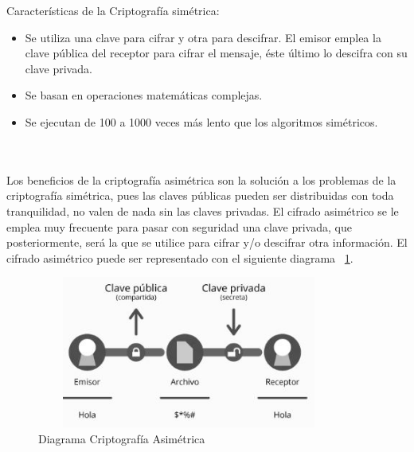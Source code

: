 \bigskip Características de la Criptografía simétrica: \begin{itemize}
	\item Se utiliza una clave para cifrar y otra para descifrar. El emisor emplea la clave pública del receptor para cifrar el mensaje, 	éste último lo descifra con su clave privada.
	\item Se basan en operaciones matemáticas complejas.
	\item Se ejecutan de 100 a 1000 veces más lento que los algoritmos simétricos.
\end{itemize} ~\cite{sime} \\ \\ 

 Los beneficios de la criptografía asimétrica son la solución a los problemas de la criptografía simétrica, pues las claves públicas pueden ser distribuidas con toda tranquilidad, no valen de nada sin las claves privadas. El cifrado asimétrico se le emplea muy frecuente para pasar con seguridad una clave privada, que posteriormente, será la que se utilice para cifrar y/o descifrar otra información. El cifrado asimétrico puede ser representado con el siguiente diagrama ~\ref{fig:1-2-4}.

\begin{figure}[H]
\centering
	\includegraphics[width=10cm, height=5cm]{./images/Cripto_Asimetrica.jpg}
	\caption{Diagrama Criptografía Asimétrica}
	\label{fig:1-2-4}
\end{figure}

